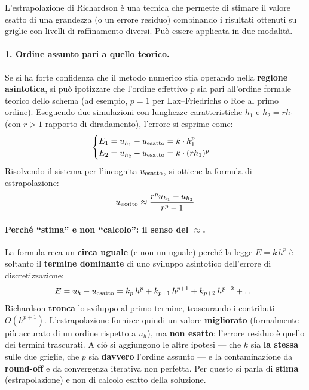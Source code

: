 L'estrapolazione di Richardson è una tecnica che permette di stimare il valore esatto di
una grandezza (o un errore residuo) combinando i risultati ottenuti su griglie con
livelli di raffinamento diversi. Può essere applicata in due modalità.

\paragraph{1. Ordine assunto pari a quello teorico.}
Se si ha forte confidenza che il metodo numerico stia operando nella \textbf{regione
asintotica}, si può ipotizzare che l'ordine effettivo $p$ sia pari all'ordine formale
teorico dello schema (ad esempio, $p=1$ per Lax--Friedrichs o Roe al primo ordine).
Eseguendo due simulazioni con lunghezze caratteristiche $h_1$ e $h_2 = r h_1$ (con
$r > 1$ rapporto di diradamento), l'errore si esprime come:
\begin{equation}
  \begin{cases}
    E_1 = u_{h_1} - u_{\rm esatto} = k \cdot h_1^p \\
    E_2 = u_{h_2} - u_{\rm esatto} = k \cdot (r h_1)^p
  \end{cases}
\end{equation}
Risolvendo il sistema per l'incognita $u_{\rm esatto}$, si ottiene la formula di
estrapolazione:
\begin{equation}
  u_{\rm esatto} \approx \frac{r^p u_{h_1} - u_{h_2}}{r^p - 1}
  \label{eq:richardson_esatta}
\end{equation}

\paragraph{Perché ``stima'' e non ``calcolo'': il senso del $\approx$.}
La formula reca un \textbf{circa uguale} (e non un uguale) perché la legge $E=k\,h^p$ è soltanto il
\textbf{termine dominante} di uno sviluppo asintotico dell'errore di discretizzazione:
\begin{equation}
  E = u_h - u_{\rm esatto} = k_p\,h^p + k_{p+1}\,h^{p+1} + k_{p+2}\,h^{p+2} + \dots
\end{equation}
Richardson \textbf{tronca} lo sviluppo al primo termine, trascurando i contributi $O(h^{p+1})$.
L'estrapolazione fornisce quindi un valore \textbf{migliorato} (formalmente più accurato di un ordine
rispetto a $u_h$), ma \textbf{non esatto}: l'errore residuo è quello dei termini trascurati. A ciò si
aggiungono le altre ipotesi --- che $k$ sia \textbf{la stessa} sulle due griglie, che $p$ sia
\textbf{davvero} l'ordine assunto --- e la contaminazione da \textbf{round-off} e da convergenza
iterativa non perfetta. Per questo si parla di \textbf{stima} (estrapolazione) e non di calcolo
esatto della soluzione.

